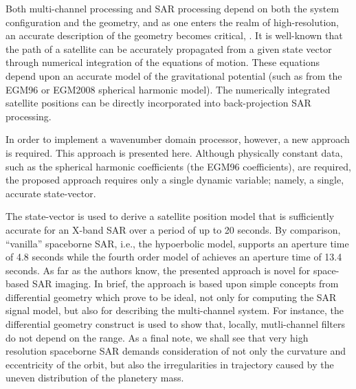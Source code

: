 \par
Both multi-channel processing and SAR processing depend on both the system configuration and the geometry, and as one enters the realm of high-resolution, an accurate description of the geometry becomes critical, \cite{Mittermayer, Luo2014}. It is well-known that the path of a satellite can be accurately propagated from a given state vector through numerical integration of the equations of motion. These equations depend upon an accurate model of the gravitational potential (such as from the EGM96 or EGM2008 spherical harmonic model). The numerically integrated satellite positions can be directly incorporated into back-projection SAR processing. 
\par 
In order to implement a wavenumber domain processor, however, a new approach is required. This approach is presented here. Although physically constant data, such as the spherical harmonic coefficients (the EGM96 coefficients), are required, the proposed approach requires only a single dynamic variable; namely, a single, accurate state-vector. 
\par
The state-vector is used to derive a satellite position model that is sufficiently accurate for an X-band SAR over a period of up to 20 seconds. By comparison, ``vanilla'' spaceborne SAR, i.e., the hypoerbolic model, supports an aperture time of 4.8 seconds while the fourth order model of \cite{Luo2014} achieves an aperture time of 13.4 seconds. As far as the authors know, the presented approach is novel for space-based SAR imaging. In brief, the approach is based upon simple concepts from differential geometry which prove to be ideal, not only for computing the SAR signal model, but also for describing the multi-channel system. For instance, the differential geometry construct is used to show that, locally, mutli-channel filters do not depend on the range. As a final note, we shall see that very high resolution spaceborne SAR demands consideration of not only the curvature and eccentricity of the orbit, but also the irregularities in trajectory caused by the uneven distribution of the planetery mass.
